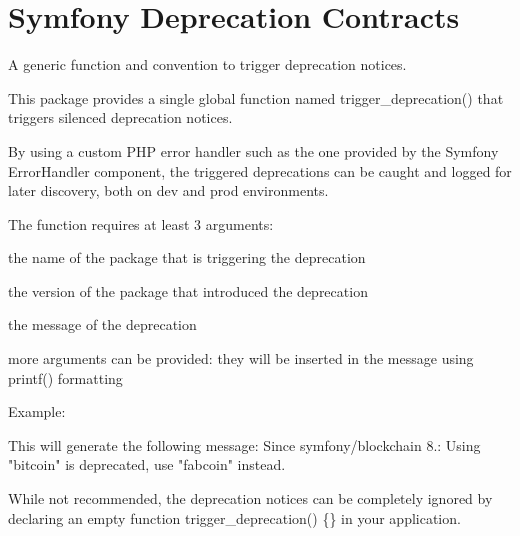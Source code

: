 \chapter{Symfony Deprecation Contracts}
\hypertarget{md_vendor_2symfony_2deprecation-contracts_2_r_e_a_d_m_e}{}\label{md_vendor_2symfony_2deprecation-contracts_2_r_e_a_d_m_e}
A generic function and convention to trigger deprecation notices.

This package provides a single global function named {\ttfamily trigger\+\_\+deprecation()} that triggers silenced deprecation notices.

By using a custom PHP error handler such as the one provided by the Symfony Error\+Handler component, the triggered deprecations can be caught and logged for later discovery, both on dev and prod environments.

The function requires at least 3 arguments\+:
\begin{DoxyItemize}
\item the name of the  package that is triggering the deprecation
\item the version of the package that introduced the deprecation
\item the message of the deprecation
\item more arguments can be provided\+: they will be inserted in the message using {\ttfamily printf()} formatting
\end{DoxyItemize}

Example\+: 
\begin{DoxyCode}{0}

\end{DoxyCode}


This will generate the following message\+: {\ttfamily Since symfony/blockchain 8.\+: Using "{}bitcoin"{} is deprecated, use "{}fabcoin"{} instead.}

While not recommended, the deprecation notices can be completely ignored by declaring an empty {\ttfamily function trigger\+\_\+deprecation() \{\}} in your application. 